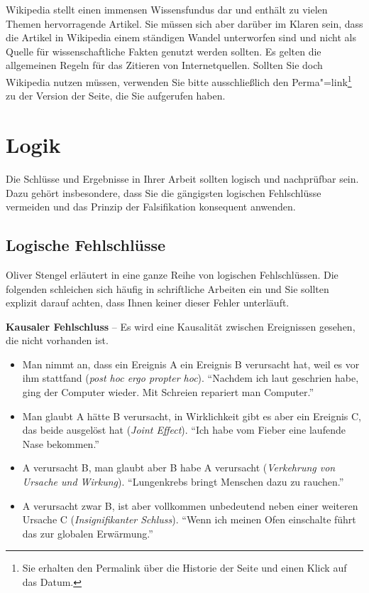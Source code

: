 \documentclass[a4paper,11pt,headings=normal]{scrartcl}
\begin{document}
Wikipedia stellt einen immensen Wissensfundus dar und enthält zu vielen Themen hervorragende Artikel. Sie müssen sich aber darüber im Klaren sein, dass die Artikel in Wikipedia einem ständigen Wandel unterworfen sind und nicht als Quelle für wissenschaftliche Fakten genutzt werden sollten. Es gelten die allgemeinen Regeln für das Zitieren von Internetquellen. Sollten Sie doch Wikipedia nutzen müssen, verwenden Sie bitte ausschließlich den Perma"=link\footnote{Sie erhalten den Permalink über die Historie der Seite und einen Klick auf das Datum.} zu der Version der Seite, die Sie aufgerufen haben.


\section{Logik}

Die Schlüsse und Ergebnisse in Ihrer Arbeit sollten logisch und nachprüfbar sein. Dazu gehört insbesondere, dass Sie die gängigsten logischen Fehlschlüsse vermeiden und das Prinzip der Falsifikation konsequent anwenden.

\subsection{Logische Fehlschlüsse}
Oliver Stengel erläutert in \autocite{Stengel2005} eine ganze Reihe von logischen Fehlschlüssen. Die folgenden schleichen sich häufig in schriftliche Arbeiten ein und Sie sollten explizit darauf achten, dass Ihnen keiner dieser Fehler unterläuft.

\vspace{0.3cm}\noindent\textbf{Kausaler Fehlschluss} -- Es wird eine Kausalität zwischen Ereignissen gesehen, die nicht vorhanden ist.
  \begin{itemize}
     \item Man nimmt an, dass ein Ereignis A ein Ereignis B verursacht hat, weil es vor ihm stattfand (\textit{post hoc ergo propter hoc}). "`Nachdem ich laut geschrien habe, ging der Computer wieder. Mit Schreien repariert man Computer."'
     \item Man glaubt A hätte B verursacht, in Wirklichkeit gibt es aber ein Ereignis C, das beide ausgelöst hat (\textit{Joint Effect}). "`Ich habe vom Fieber eine laufende Nase bekommen."'
     \item A verursacht B, man glaubt aber B habe A verursacht (\textit{Verkehrung von Ursache und Wirkung}). "`Lungenkrebs bringt Menschen dazu zu rauchen."'
     \item A verursacht zwar B, ist aber vollkommen unbedeutend neben einer weiteren Ursache C (\textit{Insignifikanter Schluss}). "`Wenn ich meinen Ofen einschalte führt das zur globalen Erwärmung."'
  \end{itemize}
\end{document}

